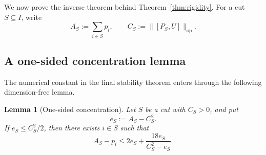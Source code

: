 \documentclass[11pt]{article}
\newtheorem{lemma}[theorem]{Lemma}
\newcommand{\op}{\mathrm{op}}
\begin{document}
We now prove the inverse theorem behind Theorem~\ref{thm:rigidity}.  For a
cut $S\subseteq I$, write
\[
  A_S:=\sum_{i\in S}p_i,
  \qquad
  C_S:=\|[P_S,U]\|_{\op}.
\]

\subsection{A one-sided concentration lemma}

The numerical constant in the final stability theorem enters through the
following dimension-free lemma.

\begin{lemma}[One-sided concentration]\label{lem:onesided}
Let $S$ be a cut with $C_S>0$, and put
\[
  e_S:=A_S-C_S^2.
\]
If $e_S\le C_S^2/2$, then there exists $i\in S$ such that
\begin{equation}\label{eq:onesided}
  A_S-p_i
  \le
  2e_S+\frac{18e_S}{C_S^2-e_S}.
\end{equation}
\end{lemma}
\end{document}
